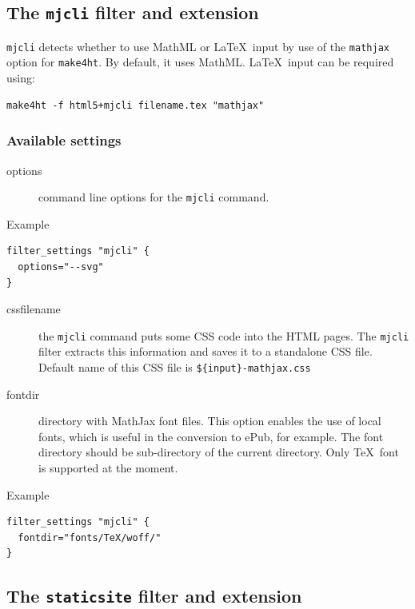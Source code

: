 \subsection{\texorpdfstring{The \texttt{mjcli} filter and
extension}{The mjcli filter and extension}}\label{mathjaxsettings}

\texttt{mjcli} detects whether to use MathML or \LaTeX~input by use of
the \texttt{mathjax} option for \texttt{make4ht}. By default, it uses
MathML. \LaTeX~input can be required using:

\begin{verbatim}
make4ht -f html5+mjcli filename.tex "mathjax"
\end{verbatim}

\subsubsection{Available settings}\label{available-settings}

\begin{description}
\item[options]
command line options for the \texttt{mjcli} command.
\end{description}

Example

\begin{verbatim}
filter_settings "mjcli" {
  options="--svg"
}
\end{verbatim}

\begin{description}
\item[cssfilename]
the \texttt{mjcli} command puts some CSS code into the HTML pages. The
\texttt{mjcli} filter extracts this information and saves it to a
standalone CSS file. Default name of this CSS file is
\texttt{\$\{input\}-mathjax.css}
\item[fontdir]
directory with MathJax font files. This option enables the use of local
fonts, which is useful in the conversion to ePub, for example. The font
directory should be sub-directory of the current directory. Only
\TeX~font is supported at the moment.
\end{description}

Example

\begin{verbatim}
filter_settings "mjcli" {
  fontdir="fonts/TeX/woff/" 
}
\end{verbatim}

\subsection{\texorpdfstring{The \texttt{staticsite} filter and
extension}{The staticsite filter and extension}}\label{the-staticsite-filter-and-extension}

